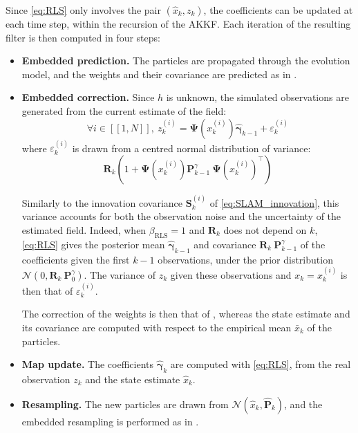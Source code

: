 Since \eqref{eq:RLS} only involves the pair $\left(\hat{x}_k,z_k\right)$, the coefficients can be updated at each time step, within the recursion of the AKKF. Each iteration of the resulting filter is then computed in four steps:
\begin{itemize}
	\item\textbf{Embedded prediction.} The particles are propagated through the evolution model, and the weights and their covariance are predicted as in .
	\item\textbf{Embedded correction.} Since $h$ is unknown, the simulated observations are generated from the current estimate of the field:
	\begin{equation}
		\forall i\in[\![1,N]\!],\:z_k^{(i)}=\boldsymbol{\Psi}\left(x_k^{(i)}\right)\hat{\boldsymbol{\gamma}}_{k-1}+\varepsilon_k^{(i)}
	\end{equation}
	where $\varepsilon_k^{(i)}$ is drawn from a centred normal distribution of variance:
	\begin{equation}
		\mathbf{R}_k\left(1+\boldsymbol{\Psi}\left(x_k^{(i)}\right)\mathbf{P}_{k-1}^\gamma\:\boldsymbol{\Psi}\left(x_k^{(i)}\right)^\top\right)\label{eq:AKKF_SLAM_variance}
	\end{equation}

	Similarly to the innovation covariance $\mathbf{S}_k^{(i)}$ of \eqref{eq:SLAM_innovation}, this variance accounts for both the observation noise and the uncertainty of the estimated field. Indeed, when $\beta_{\mathrm{RLS}}=1$ and $\mathbf{R}_k$ does not depend on $k$, \eqref{eq:RLS} gives the posterior mean $\hat{\boldsymbol{\gamma}}_{k-1}$ and covariance $\mathbf{R}_k\:\mathbf{P}_{k-1}^\gamma$ of the coefficients given the first $k-1$ observations, under the prior distribution $\mathcal{N}\left(0,\mathbf{R}_k\:\mathbf{P}_0^\gamma\right)$. The variance of $z_k$ given these observations and $x_k=x_k^{(i)}$ is then that of $\varepsilon_k^{(i)}$.

	The correction of the weights is then that of , whereas the state estimate and its covariance are computed with respect to the empirical mean $\bar{x}_k$ of the particles.
	\item\textbf{Map update.} The coefficients $\hat{\boldsymbol{\gamma}}_k$ are computed with \eqref{eq:RLS}, from the real observation $z_k$ and the state estimate $\hat{x}_k$.
	\item\textbf{Resampling.} The new particles are drawn from $\mathcal{N}\left(\hat{x}_k,\hat{\mathbf{P}}_k\right)$, and the embedded resampling is performed as in .
\end{itemize}

